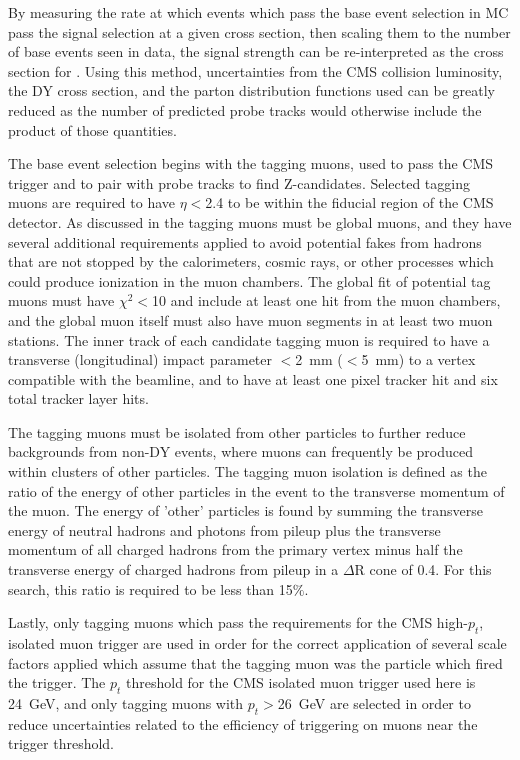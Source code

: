 By measuring the rate at which events which pass the base event selection in MC pass the signal selection at a given cross section, then scaling them to the number of base events seen in data, the signal strength can be re-interpreted as the cross section for \dbrem.
Using this method, uncertainties from the CMS collision luminosity, the DY cross section, and the parton distribution functions used can be greatly reduced as the number of predicted probe tracks would otherwise include the product of those quantities.

The base event selection begins with the tagging muons, used to pass the CMS trigger and to pair with probe tracks to find Z-candidates.
Selected tagging muons are required to have $\eta<$2.4 to be within the fiducial region of the CMS detector. 
As discussed in  the tagging muons must be global muons, and they have several additional requirements applied to avoid potential fakes from hadrons that are not stopped by the calorimeters, cosmic rays, or other processes which could produce ionization in the muon chambers.
The global fit of potential tag muons must have $\chi^2<$10 and include at least one hit from the muon chambers, and the global muon itself must also have muon segments in at least two muon stations.
The inner track of each candidate tagging muon is required to have a transverse (longitudinal) impact parameter $<$\SI{2}{\milli\meter} ($<$\SI{5}{\milli\meter}) to a vertex compatible with the beamline, and to have at least one pixel tracker hit and six total tracker layer hits.

The tagging muons must be isolated from other particles to further reduce backgrounds from non-DY events, where muons can frequently be produced within clusters of other particles.
The tagging muon isolation is defined as the ratio of the energy of other particles in the event to the transverse momentum of the muon.
The energy of 'other' particles is found by summing the transverse energy of neutral hadrons and photons from pileup plus the transverse momentum of all charged hadrons from the primary vertex minus half the transverse energy of charged hadrons from pileup in a $\Delta$R cone of 0.4. 
For this search, this ratio is required to be less than 15$\%$.

Lastly, only tagging muons which pass the requirements for the CMS high-$p_t$, isolated muon trigger are used in order for the correct application of several scale factors applied which assume that the tagging muon was the particle which fired the trigger.
The $p_t$ threshold for the CMS isolated muon trigger used here is \SI{24}{\giga\eV}, and only tagging muons with $p_t>$\SI{26}{\giga\eV} are selected in order to reduce uncertainties related to the efficiency of triggering on muons near the trigger threshold.

